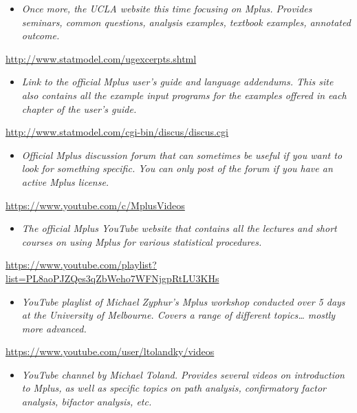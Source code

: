 \documentclass[
]{book}
\providecommand{\tightlist}{%
  \setlength{\itemsep}{0pt}\setlength{\parskip}{0pt}}
\begin{document}
\begin{itemize}
\tightlist
\item
  \emph{Once more, the UCLA website this time focusing on Mplus. Provides seminars, common questions, analysis examples, textbook examples, annotated outcome.}
\end{itemize}

\url{http://www.statmodel.com/ugexcerpts.shtml}

\begin{itemize}
\tightlist
\item
  \emph{Link to the official Mplus user's guide and language addendums. This site also contains all the example input programs for the examples offered in each chapter of the user's guide.}
\end{itemize}

\url{http://www.statmodel.com/cgi-bin/discus/discus.cgi}

\begin{itemize}
\tightlist
\item
  \emph{Official Mplus discussion forum that can sometimes be useful if you want to look for something specific. You can only post of the forum if you have an active Mplus license.}
\end{itemize}

\url{https://www.youtube.com/c/MplusVideos}

\begin{itemize}
\tightlist
\item
  \emph{The official Mplus YouTube website that contains all the lectures and short courses on using Mplus for various statistical procedures.}
\end{itemize}

\url{https://www.youtube.com/playlist?list=PL8aoPJZQes3qZbWeho7WFNjgpRtLU3KHs}

\begin{itemize}
\tightlist
\item
  \emph{YouTube playlist of Michael Zyphur's Mplus workshop conducted over 5 days at the University of Melbourne. Covers a range of different topics\ldots{} mostly more advanced.}
\end{itemize}

\url{https://www.youtube.com/user/ltolandky/videos}

\begin{itemize}
\tightlist
\item
  \emph{YouTube channel by Michael Toland. Provides several videos on introduction to Mplus, as well as specific topics on path analysis, confirmatory factor analysis, bifactor analysis, etc.}
\end{itemize}
\end{document}
